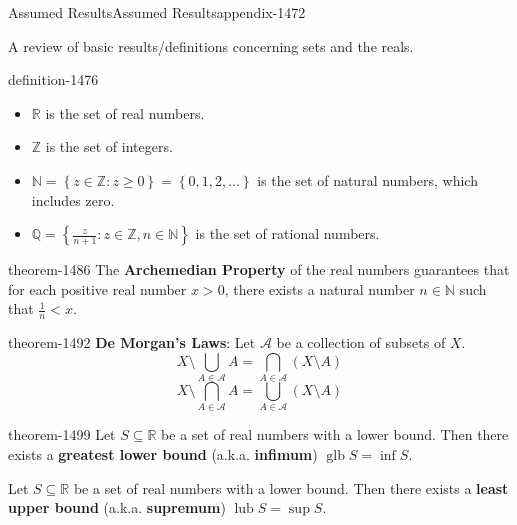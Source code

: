 \documentclass[oneside,10pt,]{article}
\newcommand{\terminology}[1]{\textbf{#1}}
\newcommand{\mb}{\mathbb}
\newcommand{\mc}{\mathcal}
\newcommand{\glb}{\operatorname{glb}}
\newcommand{\lub}{\operatorname{lub}}
\newcommand{\setBuilder}[2]{\left\{#1:#2\right\}}
\newcommand{\setList}[1]{\left\{#1\right\}}
\newcommand{\lt}{<}
\begin{document}
\begin{appendixptx}{Assumed Results}{}{Assumed Results}{}{}{appendix-1472}
\begin{introduction}{}%
\hypertarget{p-1475}{}%
A review of basic results\slash{}definitions concerning sets and the reals.%
\end{introduction}%
\begin{definition}{}{definition-1476}%
\leavevmode%
\begin{itemize}[label=\textbullet]
\item{}\(\mb R\) is the set of real numbers.%
\item{}\(\mb Z\) is the set of integers.%
\item{}\(\mb N=\setBuilder{z\in\mb Z}{z\geq 0}=\setList{0,1,2,\dots}\) is the set of natural numbers, which includes zero.%
\item{}\(\mb Q=\setBuilder{\frac{z}{n+1}}{z\in\mb Z,n\in\mb N}\) is the set of rational numbers.%
\end{itemize}
\end{definition}
\begin{theorem}{}{}{theorem-1486}%
\hypertarget{p-1487}{}%
The \terminology{Archemedian Property} of the real numbers guarantees that for each positive real number \(x>0\), there exists a natural number \(n\in\mb N\) such that \(\frac{1}{n}\lt x\).%
\end{theorem}
\begin{theorem}{}{}{theorem-1492}%
\hypertarget{p-1493}{}%
\terminology{De Morgan's Laws}: Let \(\mc A\) be a collection of subsets of \(X\).%
%
\begin{equation*}
X\setminus\bigcup_{A\in\mc A}A=\bigcap_{A\in\mc A}(X\setminus A)
\end{equation*}
%
\begin{equation*}
X\setminus\bigcap_{A\in\mc A}A=\bigcup_{A\in\mc A}(X\setminus A)
\end{equation*}
\end{theorem}
\begin{theorem}{}{}{theorem-1499}%
\hypertarget{p-1500}{}%
Let \(S\subseteq \mb R\) be a set of real numbers with a lower bound. Then there exists a \terminology{greatest lower bound} (a.k.a. \terminology{infimum}) \(\glb S=\inf S\).%
\par
\hypertarget{p-1505}{}%
Let \(S\subseteq \mb R\) be a set of real numbers with a lower bound. Then there exists a \terminology{least upper bound} (a.k.a. \terminology{supremum}) \(\lub S=\sup S\).%
\end{theorem}
\end{appendixptx}
\end{document}
